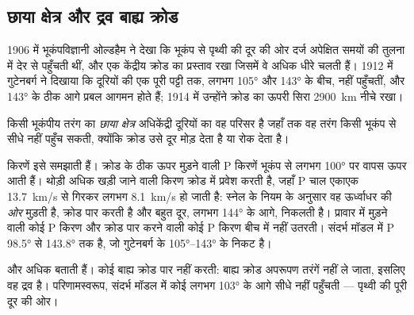 \subsection{छाया क्षेत्र और द्रव बाह्य क्रोड}

1906 में भूकंपविज्ञानी ओल्डहैम ने देखा कि भूकंप से पृथ्वी की दूर की
ओर दर्ज  अपेक्षित समयों की तुलना में देर से पहुँचती थीं,
और एक केंद्रीय क्रोड का प्रस्ताव रखा जिसमें वे अधिक धीरे चलती हैं।
1912 में गुटेनबर्ग ने दिखाया कि  दूरियों की एक पूरी पट्टी तक,
लगभग \ang{105} और \ang{143} के बीच, नहीं पहुँचतीं, और \ang{143} के ठीक आगे प्रबल
आगमन होते हैं; 1914 में उन्होंने क्रोड का ऊपरी सिरा \qty{2900}{km} नीचे रखा।

\begin{definition}[छाया क्षेत्र]\label{def:g11:seismic-structure:shadow-zone}
किसी भूकंपीय तरंग का \emph{छाया क्षेत्र} अधिकेंद्री दूरियों का
वह परिसर है जहाँ तक वह तरंग किसी भूकंप से सीधे नहीं पहुँच सकती,
क्योंकि क्रोड उसे दूर मोड़ देता है या रोक देता है।
\end{definition}

किरणें इसे समझाती हैं। क्रोड के ठीक ऊपर मुड़ने वाली P किरणें
भूकंप से लगभग \ang{100} पर वापस ऊपर आती हैं। थोड़ी अधिक खड़ी जाने वाली किरण
क्रोड में प्रवेश करती है, जहाँ P चाल एकाएक \qty{13.7}{km/s} से गिरकर
लगभग \qty{8.1}{km/s} हो जाती है: स्नेल के नियम के अनुसार वह ऊर्ध्वाधर की \emph{ओर} मुड़ती है,
क्रोड पार करती है और बहुत दूर, लगभग \ang{144} के आगे, निकलती है। प्रावार में मुड़ने वाली
कोई P किरण और क्रोड पार करने वाली कोई P किरण बीच में नहीं उतरती।
संदर्भ मॉडल में P  \ang{98.5} से
\ang{143.8} तक है, जो गुटेनबर्ग के \ang{105}--\ang{143} के निकट है।

 और अधिक बताती हैं। कोई  बाह्य क्रोड पार नहीं करती: बाह्य क्रोड
अपरूपण तरंगें नहीं ले जाता, इसलिए वह द्रव है। परिणामस्वरूप, संदर्भ मॉडल में कोई 
लगभग \ang{103} के आगे सीधे नहीं पहुँचती --- पृथ्वी की पूरी
दूर की ओर।

